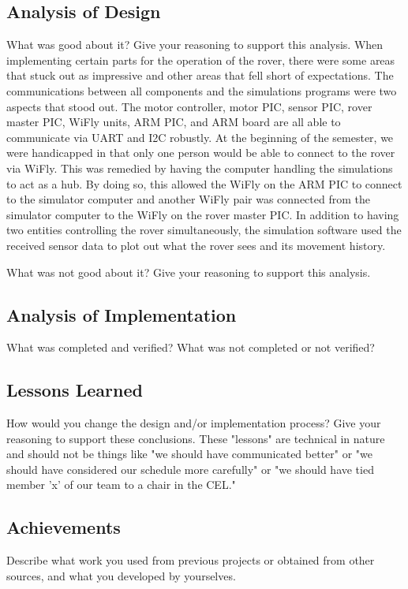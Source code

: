 {\subsection{Analysis of Design}
What was good about it? Give your reasoning to support this analysis.
When implementing certain parts for the operation of the rover, there were some areas that stuck out as impressive and other areas that fell short of expectations. The communications between all components and the simulations programs were two aspects that stood out. The motor controller, motor PIC, sensor PIC, rover master PIC, WiFly units, ARM PIC, and ARM board are all able to communicate via UART and I2C robustly. At the beginning of the semester, we were handicapped in that only one person would be able to connect to the rover via WiFly. This was remedied by having the computer handling the simulations to act as a hub. By doing so, this allowed the WiFly on the ARM PIC to connect to the simulator computer and another WiFly pair was connected from the simulator computer to the WiFly on the rover master PIC. In addition to having two entities controlling the rover simultaneously, the simulation software used the received sensor data to plot out what the rover sees and its movement history.

What was not good about it? Give your reasoning to support this analysis.


\subsection{Analysis of Implementation}
What was completed and verified? What was not completed or not verified?

\subsection{Lessons Learned}
How would you change the design and/or implementation process? Give your reasoning to support these conclusions. These "lessons" are technical in nature and should not be things like "we should have communicated better" or "we should have considered our schedule more carefully" or "we should have tied member 'x' of our team to a chair in the CEL."

\subsection{Achievements}
Describe what work you used from previous projects or obtained from other sources, and what you developed by yourselves.

}
